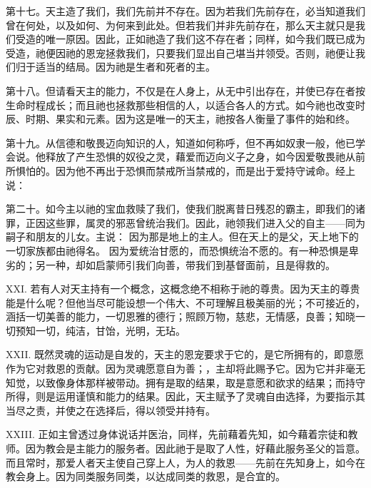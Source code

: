 第十七。天主造了我们，我们先前并不存在。因为若我们先前存在，必当知道我们曾在何处，以及如何、为何来到此处。但若我们并非先前存在，那么天主就只是我们受造的唯一原因。因此，正如祂造了我们这不存在者；同样，如今我们既已成为受造，祂便因祂的恩宠拯救我们，只要我们显出自己堪当并领受。否则，祂便让我们归于适当的结局。因为祂是生者和死者的主。\par

第十八。但请看天主的能力，不仅是在人身上，从无中引出存在，并使已存在者按生命时程成长；而且祂也拯救那些相信的人，以适合各人的方式。如今祂也改变时辰、时期、果实和元素。因为这是唯一的天主，祂按各人衡量了事件的始和终。\par

第十九。从信德和敬畏迈向知识的人，知道如何称呼，但不再如奴隶一般，他已学会说。他释放了产生恐惧的奴役之灵，藉爱而迈向义子之身，如今因爱敬畏祂从前所惧怕的。因为他不再出于恐惧而禁戒所当禁戒的，而是出于爱持守诫命。经上说：\par

第二十。如今主以祂的宝血救赎了我们，使我们脱离昔日残忍的霸主，即我们的诸罪，正因这些罪，属灵的邪恶曾统治我们。因此，祂领我们进入父的自主——同为嗣子和朋友的儿女。主说：    因为那是地上的主人。但在天上的是父，天上地下的一切家族都由祂得名。 因为爱统治甘愿的，而恐惧统治不愿的。有一种恐惧是卑劣的；另一种，却如启蒙师引我们向善，带我们到基督面前，且是得救的。\par

XXI. 若有人对天主持有一个概念，这概念绝不相称于祂的尊贵。因为天主的尊贵能是什么呢？但他当尽可能设想一个伟大、不可理解且极美丽的光；不可接近的，涵括一切美善的能力，一切恩雅的德行；照顾万物，慈悲，无情感，良善；知晓一切预知一切，纯洁，甘饴，光明，无玷。\par

XXII. 既然灵魂的运动是自发的，天主的恩宠要求于它的，是它所拥有的，即意愿作为它对救恩的贡献。因为灵魂愿意自为善；，主却将此赐予它。因为它并非毫无知觉，以致像身体那样被带动。拥有是取的结果，取是意愿和欲求的结果；而持守所得，则是运用谨慎和能力的结果。因此，天主赋予了灵魂自由选择，为要指示其当尽之责，并使之在选择后，得以领受并持有。\par

XXIII. 正如主曾透过身体说话并医治，同样，先前藉着先知，如今藉着宗徒和教师。因为教会是主能力的服务者。因此祂于是取了人性，好藉此服务圣父的旨意。而且常时，那爱人者天主使自己穿上人，为人的救恩——先前在先知身上，如今在教会身上。因为同类服务同类，以达成同类的救恩，是合宜的。\par

